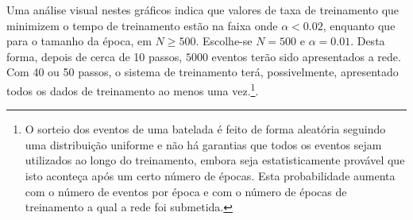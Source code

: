 
Uma análise visual nestes gráficos indica que valores de taxa de treinamento
que minimizem o tempo de treinamento estão na faixa onde $\alpha < 0.02$,
enquanto que para o tamanho da época, em $N \geq 500$. Escolhe-se $N = 500$ e
$\alpha = 0.01$. Desta forma, depois de cerca de 10 passos, $5000$ eventos
terão sido apresentados a rede. Com 40 ou 50 passos, o sistema de treinamento
terá, possivelmente, apresentado todos os dados de treinamento ao menos uma
vez.\footnote{O sorteio dos eventos de uma batelada é feito de forma aleatória
seguindo uma distribuição uniforme e não há garantias que todos os eventos
sejam utilizados ao longo do treinamento, embora seja estatisticamente
provável que isto aconteça após um certo número de épocas. Esta probabilidade
aumenta com o número de eventos por época e com o número de épocas de
treinamento a qual a rede foi submetida.}.

